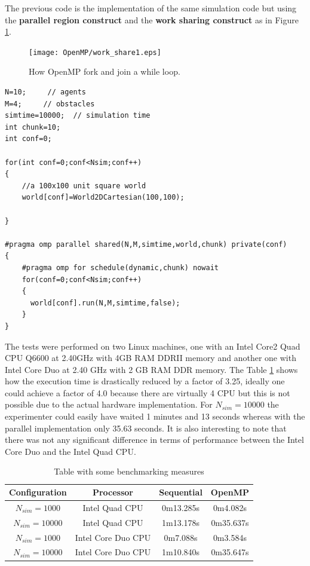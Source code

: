 The previous code is the implementation of the same simulation code
but using the \textbf{parallel region construct} and the
\textbf{work sharing construct} as in Figure \ref{Fig:Parallel:fork}.

\begin{figure}[htbp]
\begin{center}
\texttt{[image: OpenMP/work\_share1.eps]}
\end{center}
\small{
\caption[OpenMP fork loop]{
How OpenMP fork and join a while loop.
\label{Fig:Parallel:fork}}}
\end{figure}

\begin{lstlisting}
N=10;     // agents
M=4;     // obstacles
simtime=10000;  // simulation time
int chunk=10;
int conf=0;

for(int conf=0;conf<Nsim;conf++)
{
    //a 100x100 unit square world
    world[conf]=World2DCartesian(100,100);

}

#pragma omp parallel shared(N,M,simtime,world,chunk) private(conf)
{
    #pragma omp for schedule(dynamic,chunk) nowait
    for(conf=0;conf<Nsim;conf++)
    {
      world[conf].run(N,M,simtime,false);
    }
}
\end{lstlisting}
The tests were performed on two Linux machines, one with an Intel Core2 Quad CPU Q6600
at 2.40GHz with 4GB RAM DDRII memory and another one with Intel Core Duo  at 2.40 GHz with 2 GB RAM DDR memory.
The Table \ref{tab:Parallel:benchmark} shows how the execution time is drastically
reduced by a factor of 3.25, ideally one could achieve a factor of 4.0 because
there are virtually 4 CPU but this is not possible due to the actual hardware
implementation.
For $N_{sim}=10000$ the experimenter could easily have waited 1 minutes and 13 seconds
whereas with the parallel implementation only 35.63 seconds.
It is also interesting to note that there was not any significant difference in terms of performance
between the Intel Core Duo and the Intel Quad CPU.
\begin{table}[htbp]
\caption[Parallel Simulator performance]{
Table with some benchmarking measures}
\label{tab:Parallel:benchmark}
\begin{center}
\small{
\begin{tabular}{@{}c|ccc@{}}
\hline
Configuration & Processor & Sequential& OpenMP \\
\hline
$N_{sim}=1000$   & Intel Quad CPU     &  0m13.285s & 0m4.082s  \\
$N_{sim}=10000$  & Intel Quad CPU     &  1m13.178s & 0m35.637s \\
$N_{sim}=1000$   & Intel Core Duo CPU &  0m7.088s & 0m3.584s   \\
$N_{sim}=10000$  & Intel Core Duo CPU &  1m10.840s & 0m35.647s \\
\hline
\end{tabular}
}
\end{center}
\end{table}

